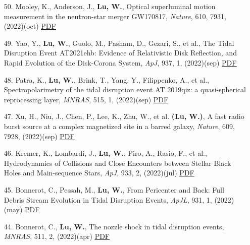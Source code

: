 \begin{itemize}[leftmargin=0.65cm]
\vspace{-0.1cm}
\item[50.]{Mooley, K., Anderson, J., {\bf Lu, W.}, {Optical superluminal motion measurement in the neutron-star merger GW170817}, {\it Nature}, 610, 7931, (2022)(oct) \href{https://ui.adsabs.harvard.edu/abs/2022Natur.610..273M}{\underline{PDF}}}

\vspace{-0.1cm}
\item[49.]{Yao, Y., {\bf Lu, W.}, Guolo, M., Pasham, D., Gezari, S., et al., {The Tidal Disruption Event AT2021ehb: Evidence of Relativistic Disk Reflection, and Rapid Evolution of the Disk-Corona System}, {\it ApJ}, 937, 1, (2022)(sep) \href{https://ui.adsabs.harvard.edu/abs/2022ApJ...937....8Y}{\underline{PDF}}}

\vspace{-0.1cm}
\item[48.]{Patra, K., {\bf Lu, W.}, Brink, T., Yang, Y., Filippenko, A., et al., {Spectropolarimetry of the tidal disruption event AT 2019qiz: a quasi-spherical reprocessing layer}, {\it MNRAS}, 515, 1, (2022)(sep) \href{https://ui.adsabs.harvard.edu/abs/2022MNRAS.515..138P}{\underline{PDF}}}

\vspace{-0.1cm}
\item[47.]{Xu, H., Niu, J., Chen, P., Lee, K., Zhu, W., et al. {\bf (Lu, W.)}, {A fast radio burst source at a complex magnetized site in a barred galaxy}, {\it Nature}, 609, 7928, (2022)(sep) \href{https://ui.adsabs.harvard.edu/abs/2022Natur.609..685X}{\underline{PDF}}}

\vspace{-0.1cm}
\item[46.]{Kremer, K., Lombardi, J., {\bf Lu, W.}, Piro, A., Rasio, F., et al., {Hydrodynamics of Collisions and Close Encounters between Stellar Black Holes and Main-sequence Stars}, {\it ApJ}, 933, 2, (2022)(jul) \href{https://ui.adsabs.harvard.edu/abs/2022ApJ...933..203K}{\underline{PDF}}}

\vspace{-0.1cm}
\item[45.]{Bonnerot, C., Pessah, M., {\bf Lu, W.}, {From Pericenter and Back: Full Debris Stream Evolution in Tidal Disruption Events}, {\it ApJL}, 931, 1, (2022)(may) \href{https://ui.adsabs.harvard.edu/abs/2022ApJ...931L...6B}{\underline{PDF}}}

\vspace{-0.1cm}
\item[44.]{Bonnerot, C., {\bf Lu, W.}, {The nozzle shock in tidal disruption events}, {\it MNRAS}, 511, 2, (2022)(apr) \href{https://ui.adsabs.harvard.edu/abs/2022MNRAS.511.2147B}{\underline{PDF}}}


\end{itemize}
